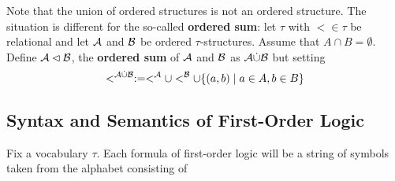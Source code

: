 \documentclass[11pt]{article}
\begin{document}
Note that the union of ordered structures is not an ordered structure. The situation is
different for the so-called \textbf{ordered sum}: let \(\tau\) with \(<\in\tau\) be relational and
let \(\mathcal{A}\) and \(\mathcal{B}\) be ordered \(\tau\)-structures. Assume that \(A\cap B=\emptyset\).
Define \(\mathcal{A}\lhd\mathcal{B}\), the \textbf{ordered sum} of \(\mathcal{A}\) and \(\mathcal{B}\) as \(\mathcal{A}\dot\cup\mathcal{B}\)
but setting
\begin{equation*}
<^{\mathcal{A}\dot\cup\mathcal{B}}:=<^{\mathcal{A}}\cup <^{\mathcal{B}}\cup
\{(a,b)\mid a\in A,b\in B\}
\end{equation*}
\subsection{Syntax and Semantics of First-Order Logic}
\label{sec:orgb154610}
Fix a vocabulary \(\tau\). Each formula of first-order logic will be a string of symbols taken from the
alphabet consisting of
\end{document}

